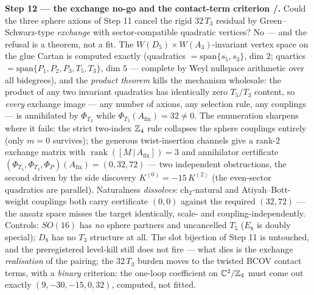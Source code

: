 \par\smallskip\noindent\textbf{Step 12 --- the exchange no-go and the contact-term criterion
\mE/\mC.} Could the three sphere axions of Step 11 cancel the rigid $32\,T_3$ residual by
Green--Schwarz-type \emph{exchange} with sector-compatible quadratic vertices? No --- and the
refusal is a theorem, not a fit. The $W(D_5){\times}W(A_3)$-invariant vertex space on the glue
Cartan is computed exactly (quadratics $=\mathrm{span}\{s_5,s_3\}$, dim $2$; quartics
$=\mathrm{span}\{P_1,P_2,P_3,T_5,T_3\}$, dim $5$ --- complete by Weyl nullspace arithmetic over
all bidegrees), and the \emph{product theorem} kills the mechanism wholesale: the product of any
two invariant quadratics has identically zero $T_5/T_3$ content, so \emph{every} exchange image
--- any number of axions, any selection rule, any couplings --- is annihilated by $\Phi_{T_3}$
while $\Phi_{T_3}(A_{\mathrm{fix}})=32\neq0$. The enumeration sharpens where it fails: the strict
two-index $\mathbb{Z}_4$ rule collapses the sphere couplings entirely (only $m=0$ survives); the generous
twist-insertion channels give a rank-$2$ exchange matrix with
$\operatorname{rank}([M\,|\,A_{\mathrm{fix}}])=3$ and annihilator certificate
$(\Phi_{T_5},\Phi_{T_3},\Phi_P)(A_{\mathrm{fix}})=(0,32,72)$ --- two independent obstructions,
the second driven by the side discovery $K^{(0)}=-15\,K^{(2)}$ (the even-sector quadratics are
parallel). Naturalness \emph{dissolves}: $\mathrm{ch}_2$-natural and Atiyah--Bott-weight couplings
both carry certificate $(0,0)$ against the required $(32,72)$ --- the ansatz space misses the
target identically, scale- and coupling-independently. Controls: $SO(16)$ has \emph{no} sphere
partners and uncancelled $T_5$ ($E_8$ is doubly special); $D_8$ has no $T_3$ structure at all.
The slot bijection of Step 11 is untouched, and the preregistered level-kill still does not fire
--- what dies is the exchange \emph{realisation} of the pairing; the $32\,T_3$ burden moves to
the twisted BCOV contact terms, with a \emph{binary} criterion: the one-loop coefficient on
$\mathbb C^2/\mathbb{Z}_4$ must come out exactly $(9,-30,-15,0,32)$, computed, not fitted.


